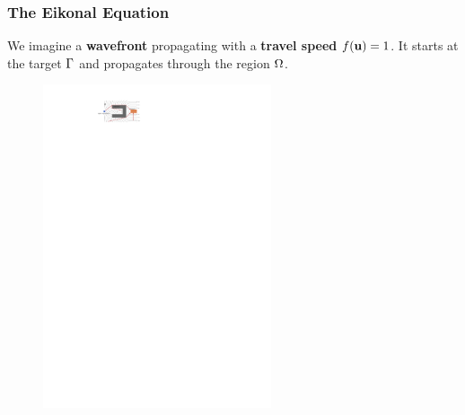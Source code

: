 \documentclass[aspectratio=169,handout]{beamer}
\begin{document}
\begin{frame}
	\frametitle{The Eikonal Equation}
	We imagine a \textbf{wavefront} propagating with a \textbf{travel speed} $f(\mathbf{u}) = 1$.
	It starts at the target $\Gamma$ and propagates through the region $\Omega$.\\
	\vspace{0.25cm}
	
	
	\begin{figure}
		\includegraphics[width=0.6\textwidth]{./figs/chicken-eikonal_en.pdf}
	\end{figure}
\end{frame}
\end{document}
